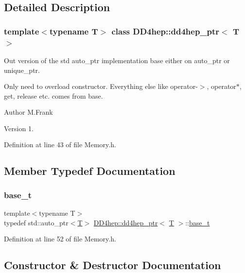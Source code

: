\subsection{Detailed Description}
\subsubsection*{template$<$typename T$>$\newline
class D\+D4hep\+::dd4hep\+\_\+ptr$<$ T $>$}

Out version of the std auto\+\_\+ptr implementation base either on auto\+\_\+ptr or unique\+\_\+ptr. 

Only need to overload constructor. Everything else like operator-\/$>$, operator$\ast$, get, release etc. comes from base.

\begin{DoxyAuthor}{Author}
M.\+Frank 
\end{DoxyAuthor}
\begin{DoxyVersion}{Version}
1. 
\end{DoxyVersion}


Definition at line 43 of file Memory.\+h.



\subsection{Member Typedef Documentation}
\hypertarget{class_d_d4hep_1_1dd4hep__ptr_a4bcbed2d2a920d0a5ffbf405263fe8d6}{}\label{class_d_d4hep_1_1dd4hep__ptr_a4bcbed2d2a920d0a5ffbf405263fe8d6} 
\subsubsection{\texorpdfstring{base\+\_\+t}{base\_t}}
{\footnotesize\ttfamily template$<$typename T$>$ \\
typedef std\+::auto\+\_\+ptr$<$\hyperlink{class_t}{T}$>$ \hyperlink{class_d_d4hep_1_1dd4hep__ptr}{D\+D4hep\+::dd4hep\+\_\+ptr}$<$ \hyperlink{class_t}{T} $>$\+::\hyperlink{class_d_d4hep_1_1dd4hep__ptr_a4bcbed2d2a920d0a5ffbf405263fe8d6}{base\+\_\+t}}



Definition at line 52 of file Memory.\+h.



\subsection{Constructor \& Destructor Documentation}
\hypertarget{class_d_d4hep_1_1dd4hep__ptr_abac6ac3d2451af4916b051b66ed696ec}{}\label{class_d_d4hep_1_1dd4hep__ptr_abac6ac3d2451af4916b051b66ed696ec} 
